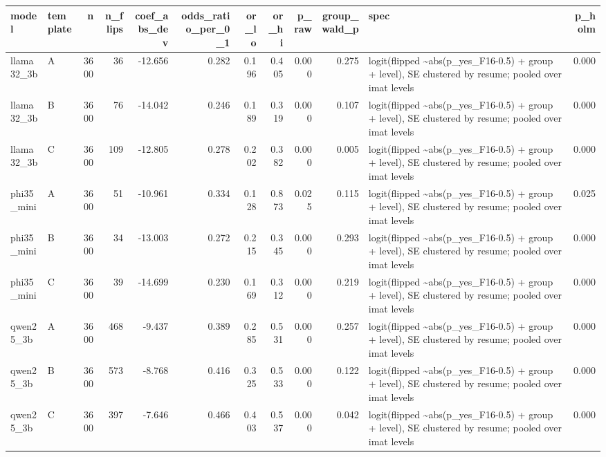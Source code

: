\begin{tabular}{llrrrrrrrrlr}
\toprule
model & template & n & n\_flips & coef\_abs\_dev & odds\_ratio\_per\_0\_1 & or\_lo & or\_hi & p\_raw & group\_wald\_p & spec & p\_holm \\
\midrule
llama32\_3b & A & 3600 & 36 & -12.656 & 0.282 & 0.196 & 0.405 & 0.000 & 0.275 & logit(flipped \textasciitilde \space abs(p\_yes\_F16-0.5) + group + level), SE clustered by resume; pooled over imat levels & 0.000 \\
llama32\_3b & B & 3600 & 76 & -14.042 & 0.246 & 0.189 & 0.319 & 0.000 & 0.107 & logit(flipped \textasciitilde \space abs(p\_yes\_F16-0.5) + group + level), SE clustered by resume; pooled over imat levels & 0.000 \\
llama32\_3b & C & 3600 & 109 & -12.805 & 0.278 & 0.202 & 0.382 & 0.000 & 0.005 & logit(flipped \textasciitilde \space abs(p\_yes\_F16-0.5) + group + level), SE clustered by resume; pooled over imat levels & 0.000 \\
phi35\_mini & A & 3600 & 51 & -10.961 & 0.334 & 0.128 & 0.873 & 0.025 & 0.115 & logit(flipped \textasciitilde \space abs(p\_yes\_F16-0.5) + group + level), SE clustered by resume; pooled over imat levels & 0.025 \\
phi35\_mini & B & 3600 & 34 & -13.003 & 0.272 & 0.215 & 0.345 & 0.000 & 0.293 & logit(flipped \textasciitilde \space abs(p\_yes\_F16-0.5) + group + level), SE clustered by resume; pooled over imat levels & 0.000 \\
phi35\_mini & C & 3600 & 39 & -14.699 & 0.230 & 0.169 & 0.312 & 0.000 & 0.219 & logit(flipped \textasciitilde \space abs(p\_yes\_F16-0.5) + group + level), SE clustered by resume; pooled over imat levels & 0.000 \\
qwen25\_3b & A & 3600 & 468 & -9.437 & 0.389 & 0.285 & 0.531 & 0.000 & 0.257 & logit(flipped \textasciitilde \space abs(p\_yes\_F16-0.5) + group + level), SE clustered by resume; pooled over imat levels & 0.000 \\
qwen25\_3b & B & 3600 & 573 & -8.768 & 0.416 & 0.325 & 0.533 & 0.000 & 0.122 & logit(flipped \textasciitilde \space abs(p\_yes\_F16-0.5) + group + level), SE clustered by resume; pooled over imat levels & 0.000 \\
qwen25\_3b & C & 3600 & 397 & -7.646 & 0.466 & 0.403 & 0.537 & 0.000 & 0.042 & logit(flipped \textasciitilde \space abs(p\_yes\_F16-0.5) + group + level), SE clustered by resume; pooled over imat levels & 0.000 \\
\bottomrule
\end{tabular}
